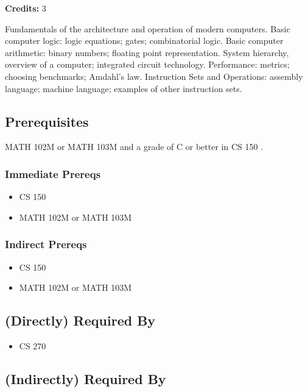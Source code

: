 \documentclass[]{article}
\providecommand{\tightlist}{%
  \setlength{\itemsep}{0pt}\setlength{\parskip}{0pt}}
\begin{document}
\textbf{Credits:} 3

Fundamentals of the architecture and operation of modern computers.
Basic computer logic: logic equations; gates; combinatorial logic. Basic
computer arithmetic: binary numbers; floating point representation.
System hierarchy, overview of a computer; integrated circuit technology.
Performance: metrics; choosing benchmarks; Amdahl's law. Instruction
Sets and Operations: assembly language; machine language; examples of
other instruction sets.

\subsection{Prerequisites}\label{prerequisites-6}

MATH 102M or MATH 103M and a grade of C or better in CS 150 .

\subsubsection{Immediate Prereqs}\label{immediate-prereqs-3}

\begin{itemize}
\tightlist
\item
  CS 150
\item
  MATH 102M or MATH 103M
\end{itemize}

\subsubsection{Indirect Prereqs}\label{indirect-prereqs-3}

\begin{itemize}
\tightlist
\item
  CS 150
\item
  MATH 102M or MATH 103M
\end{itemize}

\subsection{(Directly) Required By}\label{directly-required-by-1}

\begin{itemize}
\tightlist
\item
  CS 270
\end{itemize}

\subsection{(Indirectly) Required By}\label{indirectly-required-by-1}
\end{document}
